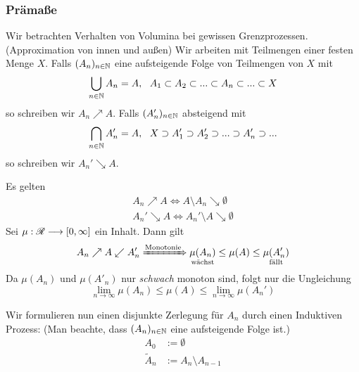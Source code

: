\subsubsection{Prämaße}
Wir betrachten Verhalten von Volumina bei gewissen Grenzprozessen. (Approximation von innen und außen) Wir arbeiten mit Teilmengen einer festen Menge $X$.\newline \newline
Falls $(A_n)_{n \in \mathbb{N}}$ eine aufsteigende Folge von Teilmengen von $X$ mit
\begin{equation*}
\bigcup_{n \in \mathbb{N}} A_n =A, \ \ A_1 \subset A_2 \subset ... \subset A_n \subset ... \subset X
\end{equation*}  so schreiben wir $A_n \nearrow A$. \newline \newline
Falls $(A'_n)_{n \in \mathbb{N}}$ absteigend mit 
\begin{equation*}
\bigcap_{n \in \mathbb{N}} A'_n = A, \ \ X \supset A_1' \supset A_2' \supset ... \supset A_n' \supset ...
\end{equation*}
so schreiben wir $A_n' \searrow A$.
\begin{beobachtung}
Es gelten
\begin{align*}
	A_n \nearrow A \iff A \setminus A_n \searrow \emptyset	\\
	A_n' \searrow A \iff A_n'	\setminus A \searrow \emptyset
\end{align*}
Sei $\mu: \mathscr{R} \longrightarrow [0,\infty]$ ein Inhalt. Dann gilt
\begin{equation*}
A_n \nearrow A \swarrow A_n' \xRightarrow[]{\text{Monotonie}} \underset{\text{wächst}}{\mu(A_n)} \leq \mu(A) \leq \underset{\text{fällt}}{\mu(A_n')}
\end{equation*}
Da $\mu(A_n)$ und $\mu(A'_n)$ nur \emph{schwach} monoton sind, folgt nur die Ungleichung
\begin{equation}	\label{I33}
\lim\limits_{n\to\infty} \mu(A_n) \leq \mu(A) \leq \lim\limits_{n \to \infty} \mu (A_n')
\end{equation}
\end{beobachtung}
Wir formulieren nun einen disjunkte Zerlegung für $A_n$ durch einen Induktiven Prozess: (Man beachte, dass $(A_n)_{n\in \mathbb{N}}$ eine aufsteigende Folge ist.)
\begin{equation*}\begin{split}
	A_0 & := \emptyset	\\
	\widetilde{A}_{n} &:= {A}_{n} \setminus A_{n-1} \end{split}
\end{equation*}
